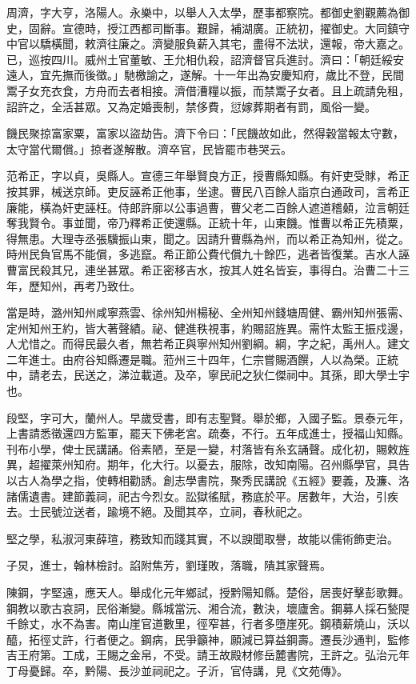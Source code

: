 \begin{pinyinscope}
周濟，字大亨，洛陽人。永樂中，以舉人入太學，歷事都察院。都御史劉觀薦為御史，固辭。宣德時，授江西都司斷事。艱歸，補湖廣。正統初，擢御史。大同鎮守中官以驕橫聞，敕濟往廉之。濟變服負薪入其宅，盡得不法狀，還報，帝大嘉之。已，巡按四川。威州土官董敏、王允相仇殺，詔濟督官兵進討。濟曰：「朝廷綏安遠人，宜先撫而後徵。」馳檄諭之，遂解。十一年出為安慶知府，歲比不登，民間鬻子女充衣食，方舟而去者相接。濟借漕糧以振，而禁鬻子女者。且上疏請免租，詔許之，全活甚眾。又為定婚喪制，禁侈費，愆嫁葬期者有罰，風俗一變。

饑民聚掠富家粟，富家以盜劫告。濟下令曰：「民饑故如此，然得穀當報太守數，太守當代爾償。」掠者遂解散。濟卒官，民皆罷市巷哭云。

范希正，字以貞，吳縣人。宣德三年舉賢良方正，授曹縣知縣。有奸吏受賕，希正按其罪，械送京師。吏反誣希正他事，坐逮。曹民八百餘人詣京白通政司，言希正廉能，橫為奸吏誣枉。侍郎許廓以公事過曹，曹父老二百餘人遮道稽顙，泣言朝廷奪我賢令。事並聞，帝乃釋希正使還縣。正統十年，山東饑。惟曹以希正先積粟，得無患。大理寺丞張驥振山東，聞之。因請升曹縣為州，而以希正為知州，從之。時州民負官馬不能償，多逃竄。希正節公費代償九十餘匹，逃者皆復業。吉水人誣曹富民殺其兄，連坐甚眾。希正密移吉水，按其人姓名皆妄，事得白。治曹二十三年，歷知州，再考乃致仕。

當是時，潞州知州咸寧燕雲、徐州知州楊秘、全州知州錢塘周健、霸州知州張需、定州知州王約，皆大著聲績。祕、健進秩視事，約賜詔旌異。需忤太監王振戍邊，人尤惜之。而得民最久者，無若希正與寧州知州劉綱。綱，字之紀，禹州人。建文二年進士。由府谷知縣遷是職。蒞州三十四年，仁宗嘗賜酒饌，人以為榮。正統中，請老去，民送之，涕泣載道。及卒，寧民祀之狄仁傑祠中。其孫，即大學士宇也。

段堅，字可大，蘭州人。早歲受書，即有志聖賢。舉於鄉，入國子監。景泰元年，上書請悉徵還四方監軍，罷天下佛老宮。疏奏，不行。五年成進士，授福山知縣。刊布小學，俾士民講誦。俗素陋，至是一變，村落皆有糸玄誦聲。成化初，賜敕旌異，超擢萊州知府。期年，化大行。以憂去，服除，改知南陽。召州縣學官，具告以古人為學之指，使轉相勸誘。創志學書院，聚秀民講說《五經》要義，及濂、洛諸儒遺書。建節義祠，祀古今烈女。訟獄徭賦，務底於平。居數年，大治，引疾去。士民號泣送者，踰境不絕。及聞其卒，立祠，春秋祀之。

堅之學，私淑河東薛瑄，務致知而踐其實，不以諛聞取譽，故能以儒術飾吏治。

子炅，進士，翰林檢討。諂附焦芳，劉瑾敗，落職，隤其家聲焉。

陳鋼，字堅遠，應天人。舉成化元年鄉試，授黔陽知縣。楚俗，居喪好擊彭歌舞。鋼教以歌古哀詞，民俗漸變。縣城當沅、湘合流，數決，壞廬舍。鋼募人採石甃隄千餘丈，水不為害。南山崖官道數里，徑窄甚，行者多墮崖死。鋼積薪燒山，沃以醯，拓徑丈許，行者便之。鋼病，民爭籲神，願減已算益鋼壽。遷長沙通判，監修吉王府第。工成，王賜之金帛，不受。請王故殿材修岳麓書院，王許之。弘治元年丁母憂歸。卒，黔陽、長沙並祠祀之。子沂，官侍講，見《文苑傳》。


\end{pinyinscope}
